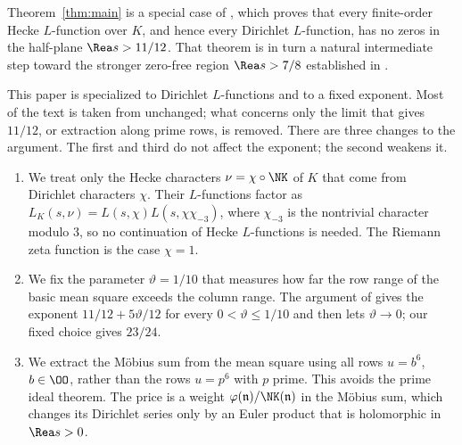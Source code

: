 Theorem~\ref{thm:main} is a special case of \cite[Theorem~1.1]{OpenAI26b}, which proves that every finite-order Hecke $L$-function over $K$, and hence every Dirichlet $L$-function, has no zeros in the half-plane $\Rea s>11/12$. That theorem is in turn a natural intermediate step toward the stronger zero-free region $\Rea s>7/8$ established in \cite[Theorem~1.1]{OpenAI26}.

This paper is \cite{OpenAI26b} specialized to Dirichlet $L$-functions and to a fixed exponent. Most of the text is taken from \cite{OpenAI26b} unchanged; what concerns only the limit that gives $11/12$, or extraction along prime rows, is removed. There are three changes to the argument. The first and third do not affect the exponent; the second weakens it.
\begin{enumerate}
\item We treat only the Hecke characters $\nu=\chi\circ\NK$ of $K$ that come from Dirichlet characters $\chi$. Their $L$-functions factor as $L_K(s,\nu)=L(s,\chi)L(s,\chi\chi_{-3})$, where $\chi_{-3}$ is the nontrivial character modulo $3$, so no continuation of Hecke $L$-functions is needed. The Riemann zeta function is the case $\chi=1$.
\item We fix the parameter $\vartheta=1/10$ that measures how far the row range of the basic mean square exceeds the column range. The argument of \cite{OpenAI26b} gives the exponent $11/12+5\vartheta/12$ for every $0<\vartheta\le1/10$ and then lets $\vartheta\to0$; our fixed choice gives $23/24$.
\item We extract the M\"obius sum from the mean square using all rows $u=b^6$, $b\in\OO$, rather than the rows $u=p^6$ with $p$ prime. This avoids the prime ideal theorem. The price is a weight $\varphi(\mathfrak n)/\NK(\mathfrak n)$ in the M\"obius sum, which changes its Dirichlet series only by an Euler product that is holomorphic in $\Rea s>0$.
\end{enumerate}

